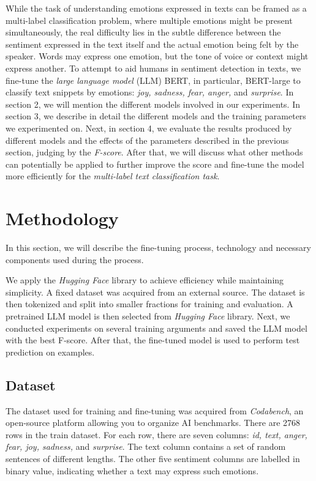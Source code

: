 \documentclass[11pt]{article}
\begin{document}
While the task of understanding emotions expressed in texts can be framed as a multi-label classification problem, where multiple emotions might be present simultaneously, the real difficulty lies in the subtle difference between the sentiment expressed in the text itself and the actual emotion being felt by the speaker. Words may express one emotion, but the tone of voice or context might express another. To attempt to aid humans in sentiment detection in texts, we fine-tune the \textit{large language model} (LLM) BERT, in particular, BERT-large to classify text snippets by emotions: \textit{joy, sadness, fear, anger,} and \textit{surprise}. In section 2, we will mention the different models involved in our experiments. In section 3, we describe in detail the different models and the training parameters we experimented on. Next, in section 4, we evaluate the results produced by different models and the effects of the parameters described in the previous section, judging by the \textit{F-score}. After that, we will discuss what other methods can potentially be applied to further improve the score and fine-tune the model more efficiently for the \textit{multi-label text classification task}.


\section{Methodology}
In this section, we will describe the fine-tuning process, technology and necessary components used during the process.

We apply the \textit{Hugging Face} library to achieve efficiency while maintaining simplicity. A fixed dataset was acquired from an external source. The dataset is then tokenized and split into smaller fractions for training and evaluation. A pretrained LLM model is then selected from \textit{Hugging Face} library. Next, we conducted experiments on several training arguments and saved the LLM model with the best F-score. After that, the fine-tuned model is used to perform test prediction on examples.
\subsection{Dataset}
The dataset used for training and fine-tuning was acquired from \textit{Codabench}, an open-source platform allowing you to organize AI benchmarks. There are 2768 rows in the train dataset. For each row, there are seven columns: \textit{id, text, anger, fear, joy, sadness,} and \textit{surprise}. The text column contains a set of random sentences of different lengths. The other five sentiment columns are labelled in binary value, indicating whether a text may express such emotions.
\end{document}

